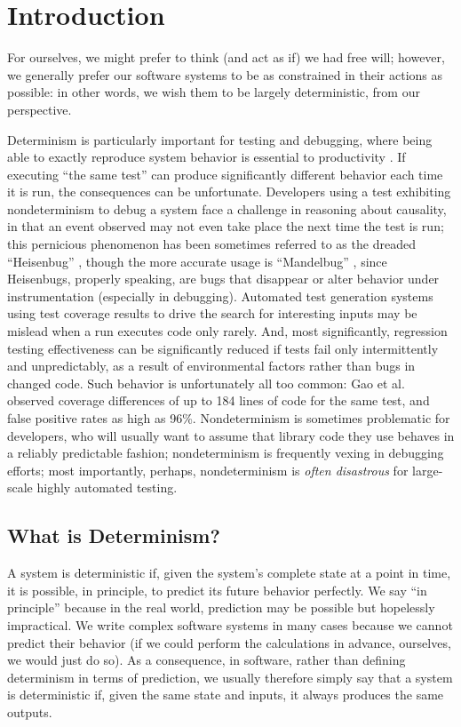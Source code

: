 \section{Introduction}

For ourselves, we might prefer to think (and act as if) we had free
will; however, we generally prefer our software systems to be as
constrained in their actions as possible:  in other words, we wish
them to be largely deterministic, from our perspective.

Determinism is particularly important for testing and debugging, where
being able to exactly reproduce system behavior is essential to
productivity \cite{Firesmith}.  If executing ``the same test'' can produce
significantly different behavior each time it is run, the consequences
can be unfortunate.  Developers using a test exhibiting nondeterminism
to debug a system
face a challenge in reasoning about causality, in that an event
observed may not even take place the next time the test is run; this
pernicious phenomenon has been sometimes referred to as the dreaded
``Heisenbug'' \cite{Heisenbug}, though the more accurate usage is
``Mandelbug'' \cite{GrottkeBugs,FaultTriggers}, since Heisenbugs, properly speaking, are bugs that disappear or
alter behavior under instrumentation (especially in debugging).
Automated test generation systems using test coverage results to drive
the search for interesting inputs may be mislead when a run executes
code only rarely.  And, most significantly, regression testing
effectiveness can be significantly reduced if tests fail only
intermittently and unpredictably, as a result of environmental
factors rather than bugs in changed code.  Such behavior is
unfortunately all too common:  Gao et
al. \cite{Gao:2015:MSU:2818754.2818764} observed coverage differences
of up to 184 lines of code for the same test, and false positive rates
as high as 96\%.  Nondeterminism is sometimes problematic for
developers, who will usually want to  assume that library code they
use behaves in a reliably predictable fashion; nondeterminism is
frequently vexing in debugging efforts; most importantly, perhaps, nondeterminism is \emph{often disastrous} for large-scale highly
automated testing.


\subsection{What is Determinism?}

A system is deterministic if, given the system's complete state at a point in
time, it is possible, in principle, to predict its future behavior
perfectly.  We say ``in principle'' because in the real world,
prediction may be possible but hopelessly impractical.  We write
complex software systems in many cases because we cannot predict their
behavior (if we could perform the calculations in advance, ourselves,
we would just do so).  As a consequence, in software, rather than
defining determinism in terms of prediction, we usually therefore
simply say that a system is deterministic if, given the same state and
inputs, it always produces the same outputs.  

